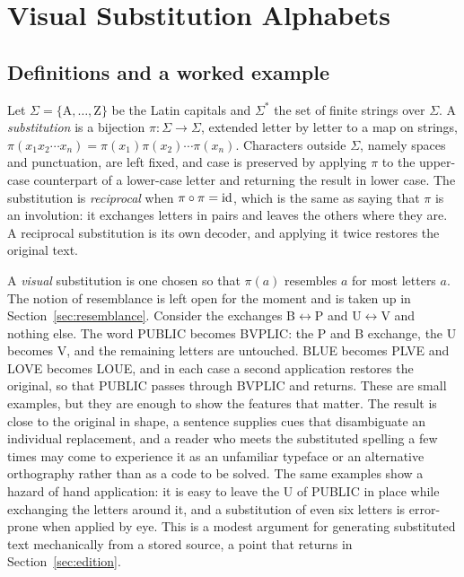 \section{Visual Substitution Alphabets}\label{sec:cipher}

\subsection{Definitions and a worked example}

Let $\Sigma=\{\mathrm{A},\dots,\mathrm{Z}\}$ be the Latin capitals and $\Sigma^{*}$ the set of finite strings over $\Sigma$. A \emph{substitution} is a bijection $\pi:\Sigma\to\Sigma$, extended letter by letter to a map on strings, $\pi(x_1x_2\cdots x_n)=\pi(x_1)\pi(x_2)\cdots\pi(x_n)$. Characters outside $\Sigma$, namely spaces and punctuation, are left fixed, and case is preserved by applying $\pi$ to the upper-case counterpart of a lower-case letter and returning the result in lower case. The substitution is \emph{reciprocal} when $\pi\circ\pi=\mathrm{id}$, which is the same as saying that $\pi$ is an involution: it exchanges letters in pairs and leaves the others where they are. A reciprocal substitution is its own decoder, and applying it twice restores the original text.

A \emph{visual} substitution is one chosen so that $\pi(a)$ resembles $a$ for most letters $a$. The notion of resemblance is left open for the moment and is taken up in Section~\ref{sec:resemblance}. Consider the exchanges B$\leftrightarrow$P and U$\leftrightarrow$V and nothing else. The word PUBLIC becomes BVPLIC: the P and B exchange, the U becomes V, and the remaining letters are untouched. BLUE becomes PLVE and LOVE becomes LOUE, and in each case a second application restores the original, so that PUBLIC passes through BVPLIC and returns. These are small examples, but they are enough to show the features that matter. The result is close to the original in shape, a sentence supplies cues that disambiguate an individual replacement, and a reader who meets the substituted spelling a few times may come to experience it as an unfamiliar typeface or an alternative orthography rather than as a code to be solved. The same examples show a hazard of hand application: it is easy to leave the U of PUBLIC in place while exchanging the letters around it, and a substitution of even six letters is error-prone when applied by eye. This is a modest argument for generating substituted text mechanically from a stored source, a point that returns in Section~\ref{sec:edition}.

